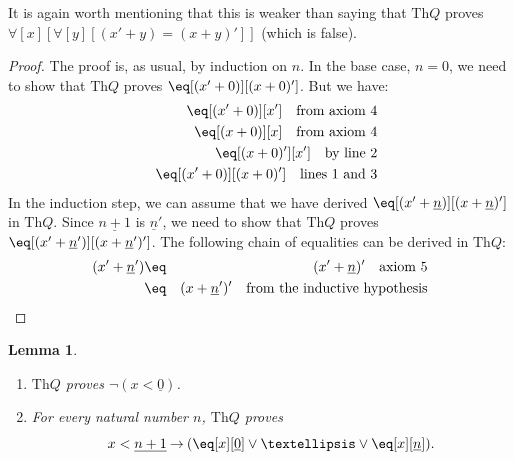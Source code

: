 \documentclass[10pt,a4paper]{article}
\theoremstyle{plain}
\newtheorem{lem}[thm]{Lemma}
\theoremstyle{definition}
\theoremstyle{remark}
\providecommand{\lif}{\mathbin{\rightarrow}}
\providecommand{\lforall}{\mathord{\forall}}
\providecommand{\Th}{\ensuremath{\mathrm{Th}}}
\providecommand{\num}[1]{\underline{#1}}
\begin{document}
It is again worth mentioning that this is weaker than saying that $\Th{Q}$
proves $\lforall[x][\lforall[y][(x' + y) = (x +y)']]$ (which is false).

\begin{proof}
The proof is, as usual, by induction on $n$. In the base case, $n =
0$, we need to show that $\Th{Q}$ proves $\eq[(x'+0)][(x+0)']$. But we have:
\begin{eqnarray*}
& & \eq[(x' + 0)][x'] \quad \text{from axiom 4} \\
& & \eq[(x + 0)][x] \quad \text{from axiom 4} \\
& & \eq[(x+0)'][x'] \quad \text{by line 2} \\
& & \eq[(x' + 0)][(x + 0)'] \quad \text{lines 1 and 3}
\end{eqnarray*}
In the induction step, we can assume that we have derived $\eq[(x' +
  \num n)][(x + \num n)']$ in $\Th{Q}$. Since $\num{n+1}$ is $\num
n'$, we need to show that $\Th{Q}$ proves $\eq[(x' + \num n')][(x + \num
n')']$. The following chain of equalities can be derived in $\Th{Q}$:
\begin{eqnarray*}
(x' + \num n') & \eq & (x' + \num n)' \quad \text{axiom 5} \\
& \eq & (x + \num n')' \quad \text{from the inductive hypothesis}
\end{eqnarray*}
\end{proof}

\begin{lem}
\begin{enumerate}
\item $\Th{Q}$ proves $\lnot (x < \num 0)$.
\item For every natural number $n$, $\Th{Q}$ proves
\[
x < \num {n+1} \lif (\eq[x][\num 0] \lor \dots \lor \eq[x][\num n]).
\]
\end{enumerate}
\end{lem}
\end{document}

